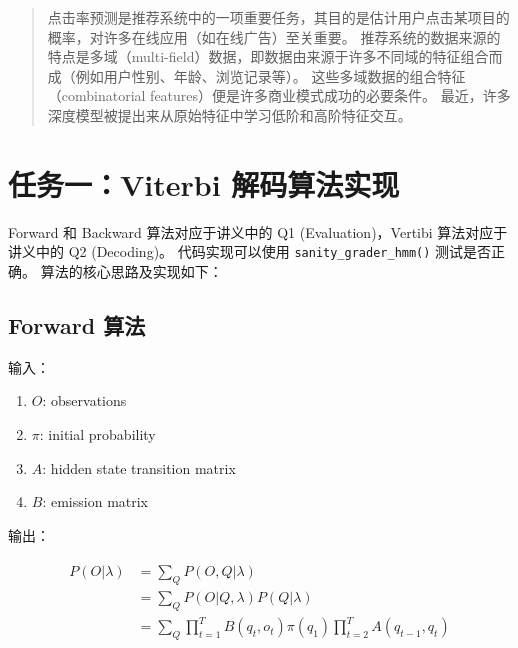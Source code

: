 \documentclass[degree=project,degree-type=project,cjk-font=noto]{thuthesis}
\begin{document}
\maketitle

\frontmatter
\begin{abstract}
  点击率预测是推荐系统中的一项重要任务，其目的是估计用户点击某项目的概率，对许多在线应用（如在线广告）至关重要。
  推荐系统的数据来源的特点是多域（multi-field）数据，即数据由来源于许多不同域的特征组合而成（例如用户性别、年龄、浏览记录等）。
  这些多域数据的组合特征（combinatorial features）便是许多商业模式成功的必要条件。
  最近，许多深度模型被提出来从原始特征中学习低阶和高阶特征交互。

\end{abstract}


\tableofcontents

\listoffigures           %

\mainmatter

\chapter{任务一：Viterbi 解码算法实现}

Forward 和 Backward 算法对应于讲义中的 Q1 (Evaluation)，Vertibi 算法对应于讲义中的 Q2 (Decoding)。
代码实现可以使用 \texttt{sanity\_grader\_hmm()} 测试是否正确。
算法的核心思路及实现如下：

\section{Forward 算法}
  输入：

  \begin{enumerate}
    \item $O$: observations
    \item $\pi$: initial probability
    \item $A$: hidden state transition matrix
    \item $B$: emission matrix
  \end{enumerate}

  输出：

  \begin{align}
    \begin{split}
      P(O | \lambda) &= \sum_{Q} P(O, Q | \lambda) \\
      &= \sum_Q P(O | Q, \lambda) P(Q | \lambda) \\
      &= \sum_Q \prod_{t=1}^T B(q_t, o_t) \pi(q_1) \prod_{t=2}^T A(q_{t-1}, q_t)
    \end{split}
    \label{algo_fwd}
  \end{align}
\end{document}
